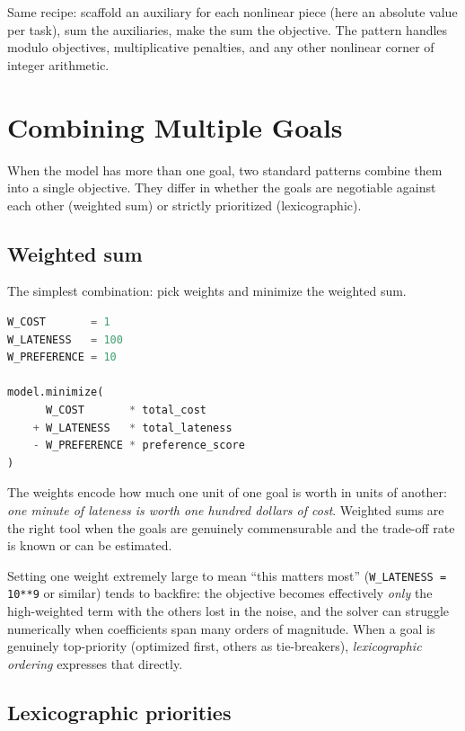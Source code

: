 Same recipe: scaffold an auxiliary for each nonlinear piece (here an
absolute value per task), sum the auxiliaries, make the sum the
objective. The pattern handles modulo objectives, multiplicative
penalties, and any other nonlinear corner of integer arithmetic.

\section{Combining Multiple Goals}\label{sec:8.3}

When the model has more than one goal, two standard patterns combine
them into a single objective. They differ in whether the goals are
negotiable against each other (weighted sum) or strictly prioritized
(lexicographic).

\subsection{Weighted sum}\label{sec:8.3.1}

The simplest combination: pick weights and minimize the weighted sum.

\begin{lstlisting}[language=Python]
W_COST       = 1
W_LATENESS   = 100
W_PREFERENCE = 10

model.minimize(
      W_COST       * total_cost
    + W_LATENESS   * total_lateness
    - W_PREFERENCE * preference_score
)
\end{lstlisting}

The weights encode how much one unit of one goal is worth in units of
another: \emph{one minute of lateness is worth one hundred dollars of
cost}. Weighted sums are the right tool when the goals are genuinely
commensurable and the trade-off rate is known or can be estimated.

Setting one weight extremely large to mean ``this matters most''
(\lstinline!W_LATENESS = 10**9! or similar) tends to
backfire: the objective becomes effectively \emph{only} the
high-weighted term with the others lost in the noise, and the solver can
struggle numerically when coefficients span many orders of magnitude.
When a goal is genuinely top-priority (optimized first, others as
tie-breakers), \emph{lexicographic ordering} expresses that directly.

\subsection{Lexicographic priorities}\label{sec:8.3.2}


